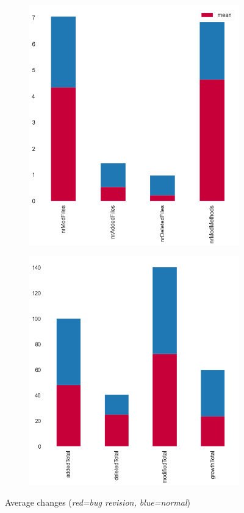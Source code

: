  \begin{figure}[H]
	\begin{subfigure}{.5\textwidth}
		\centering
		\includegraphics[scale=0.3]{./src/data_analysis/rev_files.png}

	\end{subfigure}%
	\begin{subfigure}{.5\textwidth}
		\centering
		\includegraphics[scale=0.3]{./src/data_analysis/rev_lines.png}
	\end{subfigure}
	\caption{Average changes (\textit{red=bug revision, blue=normal})}
\end{figure}

